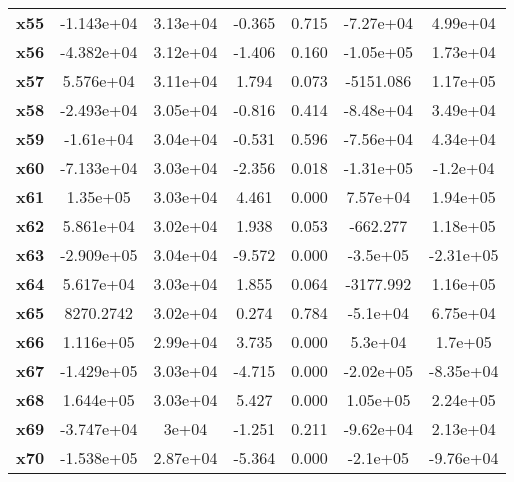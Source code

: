 \documentclass{article}
\begin{document}
\begin{center}
{\begin{tabular}{lcccccc}
\textbf{x55}   &   -1.143e+04  &     3.13e+04     &    -0.365  &         0.715        &    -7.27e+04    &     4.99e+04     \\
\textbf{x56}   &   -4.382e+04  &     3.12e+04     &    -1.406  &         0.160        &    -1.05e+05    &     1.73e+04     \\
\textbf{x57}   &    5.576e+04  &     3.11e+04     &     1.794  &         0.073        &    -5151.086    &     1.17e+05     \\
\textbf{x58}   &   -2.493e+04  &     3.05e+04     &    -0.816  &         0.414        &    -8.48e+04    &     3.49e+04     \\
\textbf{x59}   &    -1.61e+04  &     3.04e+04     &    -0.531  &         0.596        &    -7.56e+04    &     4.34e+04     \\
\textbf{x60}   &   -7.133e+04  &     3.03e+04     &    -2.356  &         0.018        &    -1.31e+05    &     -1.2e+04     \\
\textbf{x61}   &     1.35e+05  &     3.03e+04     &     4.461  &         0.000        &     7.57e+04    &     1.94e+05     \\
\textbf{x62}   &    5.861e+04  &     3.02e+04     &     1.938  &         0.053        &     -662.277    &     1.18e+05     \\
\textbf{x63}   &   -2.909e+05  &     3.04e+04     &    -9.572  &         0.000        &     -3.5e+05    &    -2.31e+05     \\
\textbf{x64}   &    5.617e+04  &     3.03e+04     &     1.855  &         0.064        &    -3177.992    &     1.16e+05     \\
\textbf{x65}   &    8270.2742  &     3.02e+04     &     0.274  &         0.784        &     -5.1e+04    &     6.75e+04     \\
\textbf{x66}   &    1.116e+05  &     2.99e+04     &     3.735  &         0.000        &      5.3e+04    &      1.7e+05     \\
\textbf{x67}   &   -1.429e+05  &     3.03e+04     &    -4.715  &         0.000        &    -2.02e+05    &    -8.35e+04     \\
\textbf{x68}   &    1.644e+05  &     3.03e+04     &     5.427  &         0.000        &     1.05e+05    &     2.24e+05     \\
\textbf{x69}   &   -3.747e+04  &        3e+04     &    -1.251  &         0.211        &    -9.62e+04    &     2.13e+04     \\
\textbf{x70}   &   -1.538e+05  &     2.87e+04     &    -5.364  &         0.000        &     -2.1e+05    &    -9.76e+04     \\

\end{tabular}}
\end{center}
\end{document}
